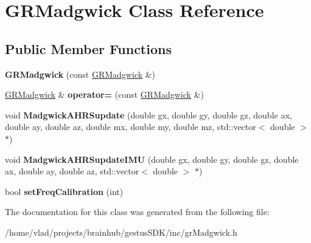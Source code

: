 \hypertarget{classGRMadgwick}{}\section{G\+R\+Madgwick Class Reference}
\label{classGRMadgwick}
\subsection*{Public Member Functions}
\begin{DoxyCompactItemize}
\item 
\mbox{\label{classGRMadgwick_abb56985d4f31d3a19072df3c4c68d747}} 
{\bfseries G\+R\+Madgwick} (const \mbox{\hyperlink{classGRMadgwick}{G\+R\+Madgwick}} \&)
\item 
\mbox{\label{classGRMadgwick_a0f73be02b42695bb4cc811d0966f19c9}} 
\mbox{\hyperlink{classGRMadgwick}{G\+R\+Madgwick}} \& {\bfseries operator=} (const \mbox{\hyperlink{classGRMadgwick}{G\+R\+Madgwick}} \&)
\item 
\mbox{\label{classGRMadgwick_a3975b7b1fb251e9cc05ee0817c7a9179}} 
void {\bfseries Madgwick\+A\+H\+R\+Supdate} (double gx, double gy, double gz, double ax, double ay, double az, double mx, double my, double mz, std\+::vector$<$ double $>$ $\ast$)
\item 
\mbox{\label{classGRMadgwick_a23586708a657d6b168facbd9e21571c8}} 
void {\bfseries Madgwick\+A\+H\+R\+Supdate\+I\+MU} (double gx, double gy, double gz, double ax, double ay, double az, std\+::vector$<$ double $>$ $\ast$)
\item 
\mbox{\label{classGRMadgwick_ab38270f0bf98485f700bebb8df813d1c}} 
bool {\bfseries set\+Freq\+Calibration} (int)
\end{DoxyCompactItemize}


The documentation for this class was generated from the following file\+:\begin{DoxyCompactItemize}
\item 
/home/vlad/projects/brainhub/gestus\+S\+D\+K/inc/gr\+Madgwick.\+h\end{DoxyCompactItemize}
